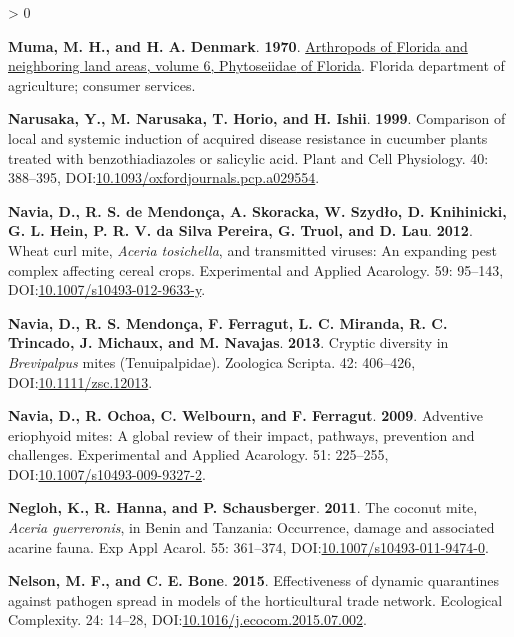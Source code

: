 \documentclass{ufdissertation}[overrideChapters] %
\newlength{\cslhangindent}
\newenvironment{CSLReferences}[2] %
 {%
  \setlength{\parindent}{0pt}
  \ifodd #1 \everypar{\setlength{\hangindent}{\cslhangindent}}\ignorespaces\fi
  \ifnum #2 > 0
  \setlength{\parskip}{#2\baselineskip}
  \fi
 }%
 {}
\begin{document}
{\begin{CSLReferences}{1}{1}
\leavevmode{}%
\textbf{Muma, M. H., and H. A. Denmark}. \textbf{1970}. \href{https://ufdc.ufl.edu/AA00000576/00001}{Arthropods of {Florida} and neighboring land areas, volume 6, {Phytoseiidae} of {Florida}}. Florida department of agriculture; consumer services.

\leavevmode{}%
\textbf{Narusaka, Y., M. Narusaka, T. Horio, and H. Ishii}. \textbf{1999}. Comparison of local and systemic induction of acquired disease resistance in cucumber plants treated with benzothiadiazoles or salicylic acid. Plant and Cell Physiology. 40: 388--395, DOI:\href{https://doi.org/10.1093/oxfordjournals.pcp.a029554}{10.1093/oxfordjournals.pcp.a029554}.

\leavevmode{}%
\textbf{Navia, D., R. S. de Mendonça, A. Skoracka, W. Szydło, D. Knihinicki, G. L. Hein, P. R. V. da Silva Pereira, G. Truol, and D. Lau}. \textbf{2012}. {Wheat curl mite}, {\emph{Aceria tosichella}}, and transmitted viruses: An expanding pest complex affecting cereal crops. Experimental and Applied Acarology. 59: 95--143, DOI:\href{https://doi.org/10.1007/s10493-012-9633-y}{10.1007/s10493-012-9633-y}.

\leavevmode{}%
\textbf{Navia, D., R. S. Mendonça, F. Ferragut, L. C. Miranda, R. C. Trincado, J. Michaux, and M. Navajas}. \textbf{2013}. Cryptic diversity in {\emph{Brevipalpus}} mites ({Tenuipalpidae}). Zoologica Scripta. 42: 406--426, DOI:\href{https://doi.org/10.1111/zsc.12013}{10.1111/zsc.12013}.

\leavevmode{}%
\textbf{Navia, D., R. Ochoa, C. Welbourn, and F. Ferragut}. \textbf{2009}. Adventive eriophyoid mites: A global review of their impact, pathways, prevention and challenges. Experimental and Applied Acarology. 51: 225--255, DOI:\href{https://doi.org/10.1007/s10493-009-9327-2}{10.1007/s10493-009-9327-2}.

\leavevmode{}%
\textbf{Negloh, K., R. Hanna, and P. Schausberger}. \textbf{2011}. The coconut mite, {\emph{Aceria guerreronis}}, in {Benin} and {Tanzania}: Occurrence, damage and associated acarine fauna. Exp Appl Acarol. 55: 361--374, DOI:\href{https://doi.org/10.1007/s10493-011-9474-0}{10.1007/s10493-011-9474-0}.

\leavevmode{}%
\textbf{Nelson, M. F., and C. E. Bone}. \textbf{2015}. Effectiveness of dynamic quarantines against pathogen spread in models of the horticultural trade network. Ecological Complexity. 24: 14--28, DOI:\href{https://doi.org/10.1016/j.ecocom.2015.07.002}{10.1016/j.ecocom.2015.07.002}.


\end{CSLReferences}}
\end{document}
